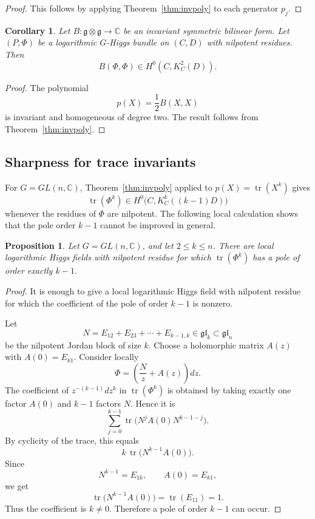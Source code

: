 \documentclass[11pt,reqno]{amsart}
\numberwithin{equation}{section}
\theoremstyle{plain}
\newtheorem{proposition}[theorem]{Proposition}
\newtheorem{corollary}[theorem]{Corollary}
\theoremstyle{definition}
\theoremstyle{remark}
\begin{document}
\begin{proof}
This follows by applying Theorem~\ref{thm:invpoly} to each generator
\(p_j\).
\end{proof}




\begin{corollary}
\label{cor:quadratic}
Let
\(
        B:\mathfrak g\otimes\mathfrak g\longrightarrow\mathbb C
\)
be an invariant symmetric bilinear form.  Let \((P,\Phi)\) be a logarithmic
\(G\)-Higgs bundle on \((C,D)\) with nilpotent residues. Then
\[
        B(\Phi,\Phi)\in H^0(C,K_C^2(D)).
\]
\end{corollary}

\begin{proof}
The polynomial
\[
        p(X)=\frac12 B(X,X)
\]
is invariant and homogeneous of degree two.  The result follows from
Theorem~\ref{thm:invpoly}.
\end{proof}


\subsection{Sharpness for trace invariants}

For \(G=GL(n,\mathbb C)\), Theorem~\ref{thm:invpoly} applied to
\(
        p(X)=\operatorname{tr}(X^k)
\)
gives
\[
        \operatorname{tr}(\Phi^k)
        \in
        H^0\bigl(C,K_C^k((k-1)D)\bigr)
\]
whenever the residues of \(\Phi\) are nilpotent.  The following local
calculation shows that the pole order \(k-1\) cannot be improved in general.

\begin{proposition}
\label{prop:trace-sharp}
Let \(G=GL(n,\mathbb C)\), and let \(2\leq k\leq n\).  There are local logarithmic Higgs fields with nilpotent residue for which
\(
        \operatorname{tr}(\Phi^k)
\)
has a pole of order exactly \(k-1\).
\end{proposition}

\begin{proof}
It is enough to give a local logarithmic Higgs field with nilpotent residue for
which the coefficient of the pole of order \(k-1\) is nonzero.

Let
\[
        N=E_{12}+E_{23}+\cdots+E_{k-1,k}
        \in\mathfrak{gl}_k\subset\mathfrak{gl}_n
\]
be the nilpotent Jordan block of size \(k\). Choose a holomorphic matrix
\(A(z)\) with
\(
        A(0)=E_{k1}.
\)
Consider locally
\[
        \Phi=
        \left(
        \frac{N}{z}+A(z)
        \right)dz .
\]
The coefficient of \(z^{-(k-1)}dz^k\) in \(\operatorname{tr}(\Phi^k)\) is
obtained by taking exactly one factor \(A(0)\) and \(k-1\) factors \(N\). Hence
it is
\[
        \sum_{j=0}^{k-1}
        \operatorname{tr}
        \bigl(
        N^jA(0)N^{k-1-j}
        \bigr).
\]
By cyclicity of the trace, this equals
\[
        k\,\operatorname{tr}\bigl(N^{k-1}A(0)\bigr).
\]
Since
\[
        N^{k-1}=E_{1k},
        \qquad
        A(0)=E_{k1},
\]
we get
\[
        \operatorname{tr}\bigl(N^{k-1}A(0)\bigr)
        =
        \operatorname{tr}(E_{11})
        =
        1.
\]
Thus the coefficient is \(k\neq0\).  Therefore a pole of order \(k-1\) can occur.
\end{proof}
\end{document}
